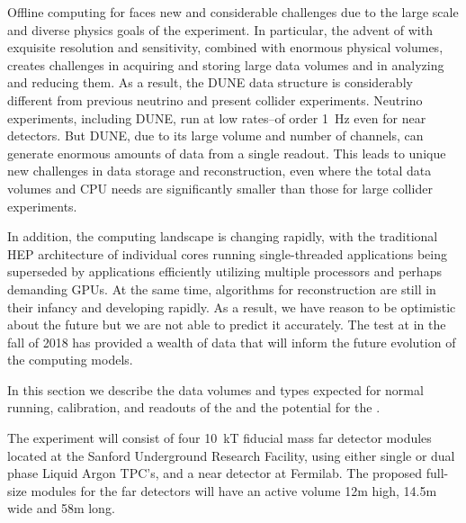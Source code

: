 Offline computing for   faces new and considerable challenges due to the large scale and diverse physics goals of the experiment.  In particular, the advent of  with exquisite resolution and sensitivity, combined with enormous physical volumes, creates challenges in acquiring and storing large data volumes and in analyzing and reducing them.  
As a result, the DUNE data structure is considerably different from previous neutrino and present collider experiments.  Neutrino experiments, including DUNE, run at low rates--of order \SI{1}{Hz} even for near detectors. But DUNE, due to its large volume and number of channels, can generate enormous amounts of data from a single readout.
This leads to unique new challenges in data storage and reconstruction, even where the total data volumes and CPU needs are significantly smaller than those for large collider experiments.  

In addition, the computing landscape is changing rapidly, with the traditional HEP architecture of individual cores running single-threaded applications being superseded by applications efficiently utilizing multiple processors and perhaps demanding GPUs. At the same time, algorithms for  reconstruction are still in their infancy and developing rapidly.  As a result, we have reason to be optimistic about the future but we are not able to predict it accurately.  The  test at  in the fall of 2018 has provided a wealth of data that will inform the future evolution of  the  computing models.

In this section we describe the data volumes and types expected for normal running, calibration, and  readouts of the  and the potential for the . 




The  experiment will consist of four 10~kT fiducial mass far detector modules located at  the Sanford Underground Research Facility, using either single or dual phase Liquid Argon TPC's, and a near detector at Fermilab. The proposed  full-size  modules for the far detectors will  have an active volume 12m high, 14.5m wide and 58m long. 

